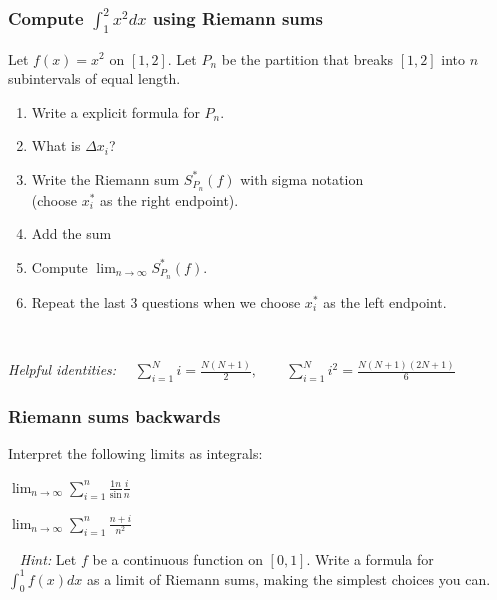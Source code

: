 \documentclass[14pt]{beamer}
\newcommand{\setsize}[1]{\fontsize{#1}{#1}\selectfont} %
\newcommand{\smallerfont}{\setsize{13}} %
\begin{document}
	\begin{frame}[t]
		\smallerfont
		\frametitle{Compute ${\displaystyle \int_1^2 \! x^2 dx}$ using Riemann sums}

		\begin{block}{}
			Let ${\displaystyle f(x) = x^2}$ on $[1,2]$. Let $P_{n}$ be the partition
			that breaks $[1,2]$ into $n$ subintervals of equal length.
			\begin{enumerate}
				\item Write a explicit formula for $P_{n}$.

				\item What is $\Delta x_{i}$?

				\item Write the Riemann sum ${\displaystyle S^*_{P_n} (f)}$ with sigma notation
					\\ (choose $x^{*}_{i}$ as the right endpoint).

				\item Add the sum

				\item Compute ${\displaystyle \lim_{n \to \infty} S^*_{P_n} (f)}$.

				\item Repeat the last 3 questions when we choose $x^{*}_{i}$ as the left
					endpoint.
			\end{enumerate}
		\end{block}
		\

		{\setsize{10} \emph{Helpful identities:} ${\displaystyle \quad \sum_{i=1}^N i = \frac{N(N+1)}{2}, \quad \quad \sum_{i=1}^{N} i^2 = \frac{N(N+1)(2N+1)}{6}}$ }
	\end{frame}
	\begin{frame}[t]
		\frametitle{Riemann sums backwards}

		Interpret the following limits as integrals:
		\begin{enumerate}
		\end{enumerate}
		\
 {\setsize{10} \emph{Hint:} Let $f$ be a continuous function on $[0,1]$. Write a formula for ${\displaystyle \int_0^1 f(x) dx}$ as a limit of Riemann sums, making the simplest choices you can. }
	\end{frame}
\end{document}
